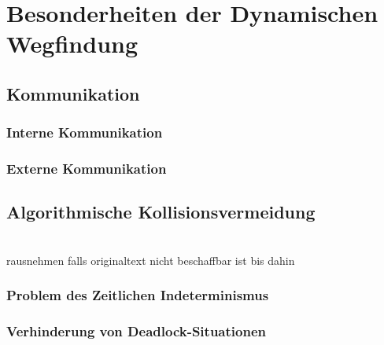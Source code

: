 \chapter{Besonderheiten der Dynamischen Wegfindung}

\section{Kommunikation}

\subsection{Interne Kommunikation}

\subsection{Externe Kommunikation}

\section{Algorithmische Kollisionsvermeidung}

\cite{Silver2005}
\\
\cite{Zelinsky1992}rausnehmen falls originaltext nicht beschaffbar ist bis dahin

\subsection{Problem des Zeitlichen Indeterminismus}

\cite{Erdmann1986}
\subsection{Verhinderung von Deadlock-Situationen}

